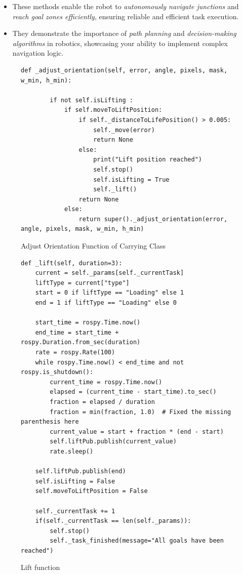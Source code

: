 \documentclass[a4paper,12pt]{extreport}
\begin{document}
\begin{itemize}
\item
  These methods enable the robot to \emph{autonomously navigate
  junctions} and \emph{reach goal zones efficiently}, ensuring reliable
  and efficient task execution.
\item
  They demonstrate the importance of \emph{path planning} and
  \emph{decision-making algorithms} in robotics, showcasing your ability
  to implement complex navigation logic.
\end{itemize}

\begin{figure}
  \begin{verbatim}
def _adjust_orientation(self, error, angle, pixels, mask, w_min, h_min):
        
        if not self.isLifting :
            if self.moveToLiftPosition:
                if self._distanceToLifePosition() > 0.005:
                    self._move(error)
                    return None
                else:
                    print("Lift position reached")
                    self.stop()
                    self.isLifting = True
                    self._lift()
                return None
            else:
                return super()._adjust_orientation(error, angle, pixels, mask, w_min, h_min)

\end{verbatim}
\caption{Adjust Orientation Function of Carrying Class}
\end{figure}

\begin{figure}[h!]
  \begin{verbatim}
def _lift(self, duration=3):
    current = self._params[self._currentTask]
    liftType = current["type"]
    start = 0 if liftType == "Loading" else 1
    end = 1 if liftType == "Loading" else 0

    start_time = rospy.Time.now()
    end_time = start_time + rospy.Duration.from_sec(duration)
    rate = rospy.Rate(100)  
    while rospy.Time.now() < end_time and not rospy.is_shutdown():
        current_time = rospy.Time.now()
        elapsed = (current_time - start_time).to_sec()
        fraction = elapsed / duration
        fraction = min(fraction, 1.0)  # Fixed the missing parenthesis here
        current_value = start + fraction * (end - start)
        self.liftPub.publish(current_value)
        rate.sleep()

    self.liftPub.publish(end)
    self.isLifting = False
    self.moveToLiftPosition = False

    self._currentTask += 1
    if(self._currentTask == len(self._params)):
        self.stop()
        self._task_finished(message="All goals have been reached")
\end{verbatim}
\caption{Lift function}
\end{figure}
\end{document}
